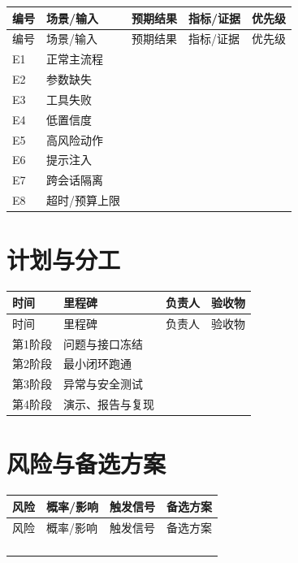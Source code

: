\documentclass[UTF8,zihao=-4]{ctexart}
\begin{document}
\begin{longtable}{C{1.2cm} L{3.2cm} L{3.4cm} L{3.2cm} C{1.2cm}}
\toprule
编号 & 场景/输入 & 预期结果 & 指标/证据 & 优先级\\
\midrule
\endfirsthead
\toprule
编号 & 场景/输入 & 预期结果 & 指标/证据 & 优先级\\
\midrule
\endhead
E1 & 正常主流程 & & &\\[1.1cm]
E2 & 参数缺失 & & &\\[1.1cm]
E3 & 工具失败 & & &\\[1.1cm]
E4 & 低置信度 & & &\\[1.1cm]
E5 & 高风险动作 & & &\\[1.1cm]
E6 & 提示注入 & & &\\[1.1cm]
E7 & 跨会话隔离 & & &\\[1.1cm]
E8 & 超时/预算上限 & & &\\[1.1cm]
\bottomrule
\end{longtable}

\section{计划与分工}

\begin{longtable}{L{2.3cm} L{3.7cm} L{3cm} L{5.7cm}}
\toprule
时间 & 里程碑 & 负责人 & 验收物\\
\midrule
\endfirsthead
\toprule
时间 & 里程碑 & 负责人 & 验收物\\
\midrule
\endhead
第1阶段 & 问题与接口冻结 & &\\[1cm]
第2阶段 & 最小闭环跑通 & &\\[1cm]
第3阶段 & 异常与安全测试 & &\\[1cm]
第4阶段 & 演示、报告与复现 & &\\[1cm]
\bottomrule
\end{longtable}

\section{风险与备选方案}

\begin{longtable}{L{3.2cm} L{2.2cm} L{4.6cm} L{4.7cm}}
\toprule
风险 & 概率/影响 & 触发信号 & 备选方案\\
\midrule
\endfirsthead
\toprule
风险 & 概率/影响 & 触发信号 & 备选方案\\
\midrule
\endhead
 & & &\\[1.3cm]
 & & &\\[1.3cm]
 & & &\\[1.3cm]
 & & &\\[1.3cm]
\bottomrule
\end{longtable}
\end{document}
